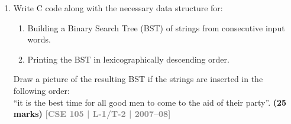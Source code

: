 \documentclass[12pt,a3paper]{article}
\newcommand{\yr}[1]{\hfill\textcolor{gray}{\small\textbf{[#1]}}}
\newcommand{\mk}[1]{\textcolor{orange!70!black}{\small\textbf{(#1 marks)}}}
\begin{document}
\begin{enumerate}
\item Write C code along with the necessary data structure for:
\begin{enumerate}
  \item Building a Binary Search Tree (BST) of strings from consecutive input words.
  \item Printing the BST in lexicographically descending order.
\end{enumerate}
Draw a picture of the resulting BST if the strings are inserted in the following order:\\
``it is the best time for all good men to come to the aid of their party''.
\mk{25} \yr{CSE 105 | L-1/T-2 | 2007--08}

\end{enumerate}
\end{document}
